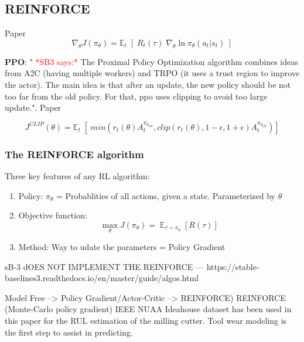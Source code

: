 \documentclass[a4paper, 12pt]{article}
\begin{document}
\subsection{REINFORCE} 
Paper \citep{REINFORCE-williams1992}
\begin{equation}
	\nabla_ \theta J(\pi_\theta) = \mathbb{E}_t \; [ \; R_t(\tau) \; \nabla_\theta \ln \pi_\theta(a_t \vert s_t) \;]
	\label{eq:REINFORCE}
\end{equation}




\textbf{PPO}: " \textcolor{red}{*SB3 says:*} The Proximal Policy Optimization algorithm combines ideas from A2C (having multiple workers) and TRPO (it uses a trust region to improve the actor). The main idea is that after an update, the new policy should be not too far from the old policy. For that, ppo uses clipping to avoid too large update.". Paper \citep{PPO-schulman2017}


\begin{equation}
	J^{CLIP} (\theta) = \mathbb{E}_t \; [ \; min (r_t(\theta) A^{\pi_{\theta_{old}}}_t, clip(r_t(\theta), 1-\epsilon, 1+\epsilon) A^{\pi_{\theta_{old}}}_t)]
	\label{eq:PPO}
\end{equation}

\subsubsection{The REINFORCE algorithm}
Three key features of any RL algorithm:
\begin{enumerate}
	\item Policy: $\pi_\theta$ = Probablities of all actions, given a state. Parameterized by $\theta$
	\item Objective function:
	\begin{equation}
		\max_{\theta} J(\pi_{\theta}) = \mathop{\mathbb{E}}_{\tau \sim \pi_\theta} [R(\tau)]
	\end{equation}
	\item Method: Way to udate the parameters = Policy Gradient
\end{enumerate}
sB-3 dOES NOT IMPLEMENT THE REINFORCE	 --- https://stable-baselines3.readthedocs.io/en/master/guide/algos.html

Model Free --> Policy Gradient/Actor-Critic --> REINFORCE)
REINFORCE (Monte-Carlo policy gradient) 
IEEE NUAA Ideahouse dataset has been used in this paper for the RUL estimation of the milling cutter. \cite{NUAA-data-set} Tool wear modeling is the first step to assist in predicting. 
\end{document}
